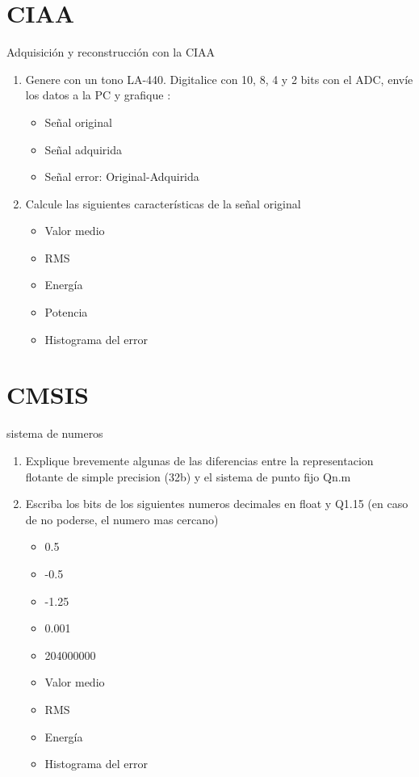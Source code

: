  \section{CIAA}
 \begin{frame}{Adquisición y reconstrucción con la CIAA}
    \begin{enumerate}
       \item{Genere con un tono LA-440. Digitalice con 10, 8, 4 y 2 bits con el ADC, envíe los datos a la PC y grafique :}
          \begin{itemize}
             \item{Señal original}
             \item{Señal adquirida}
             \item{Señal error: Original-Adquirida}
          \end{itemize}
       \item{Calcule las siguientes características de la señal original}
   \begin{itemize}
      \item{Valor medio}
      \item{RMS}
      \item{Energía}
      \item{Potencia}
      \item{Histograma del error}
   \end{itemize}
    \end{enumerate}
 \end{frame}
 \section{CMSIS}
 \begin{frame}{sistema de numeros}
    \begin{enumerate}
       \item{Explique brevemente algunas de las diferencias entre la representacion flotante de simple precision (32b) y el sistema de punto fijo Qn.m}
       \item{Escriba los bits de los siguientes numeros decimales en float y Q1.15 (en caso de no poderse, el numero mas cercano)}
          \begin{itemize}
             \item{0.5}
             \item{-0.5}
             \item{-1.25}
             \item{0.001}
             \item{204000000}
          \end{itemize}
   \begin{itemize}
      \item{Valor medio}
      \item{RMS}
      \item{Energía}
      \item{Histograma del error}
   \end{itemize}
    \end{enumerate}
 \end{frame}
